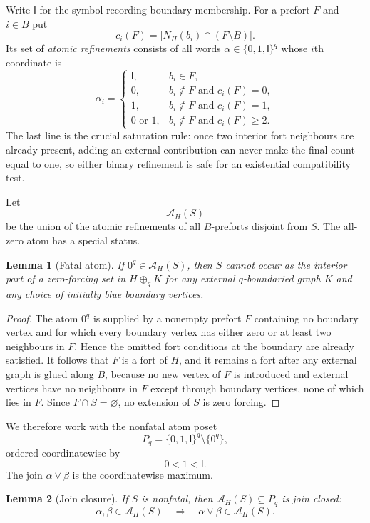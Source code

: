 \documentclass[11pt,reqno]{amsart}
\newtheorem{lemma}[lemma]{Lemma}
\theoremstyle{definition}
\begin{document}
Write $\mathsf I$ for the symbol recording boundary membership.  For a prefort
$F$ and $i\in B$ put
\[
 c_i(F)=|N_H(b_i)\cap(F\setminus B)|.
\]
Its set of \emph{atomic refinements} consists of all words
$\alpha\in\{0,1,\mathsf I\}^q$ whose $i$th coordinate is
\[
 \alpha_i=\begin{cases}
 \mathsf I,&b_i\in F,\\
 0,&b_i\notin F\text{ and }c_i(F)=0,\\
 1,&b_i\notin F\text{ and }c_i(F)=1,\\
 0\text{ or }1,&b_i\notin F\text{ and }c_i(F)\ge2.
 \end{cases}
\]
The last line is the crucial saturation rule: once two interior fort
neighbours are already present, adding an external contribution can never
make the final count equal to one, so either binary refinement is safe for an
existential compatibility test.

Let
\[
  \mathcal A_H(S)
\]
be the union of the atomic refinements of all $B$-preforts disjoint from $S$.
The all-zero atom has a special status.

\begin{lemma}[Fatal atom]\label{lem:fatal-atom}
If $0^q\in\mathcal A_H(S)$, then $S$ cannot occur as the interior part of a
zero-forcing set in $H\oplus_q K$ for any external $q$-boundaried graph $K$ and
any choice of initially blue boundary vertices.
\end{lemma}

\begin{proof}
The atom $0^q$ is supplied by a nonempty prefort $F$ containing no boundary
vertex and for which every boundary vertex has either zero or at least two
neighbours in $F$.  Hence the omitted fort conditions at the boundary are
already satisfied.  It follows that $F$ is a fort of $H$, and it remains a fort after any
external graph is glued along $B$, because no new vertex of $F$ is introduced
and external vertices have no neighbours in $F$ except through boundary
vertices, none of which lies in $F$.  Since $F\cap S=\varnothing$, no extension
of $S$ is zero forcing.
\end{proof}

We therefore work with the nonfatal atom poset
\[
  P_q=\{0,1,\mathsf I\}^q\setminus\{0^q\},
\]
ordered coordinatewise by
\[
  0<1<\mathsf I.
\]
The join $\alpha\vee\beta$ is the coordinatewise maximum.

\begin{lemma}[Join closure]\label{lem:atom-join-closed}
If $S$ is nonfatal, then $\mathcal A_H(S)\subseteq P_q$ is join closed:
\[
 \alpha,\beta\in\mathcal A_H(S)
 \quad\Longrightarrow\quad
 \alpha\vee\beta\in\mathcal A_H(S).
\]
\end{lemma}
\end{document}
